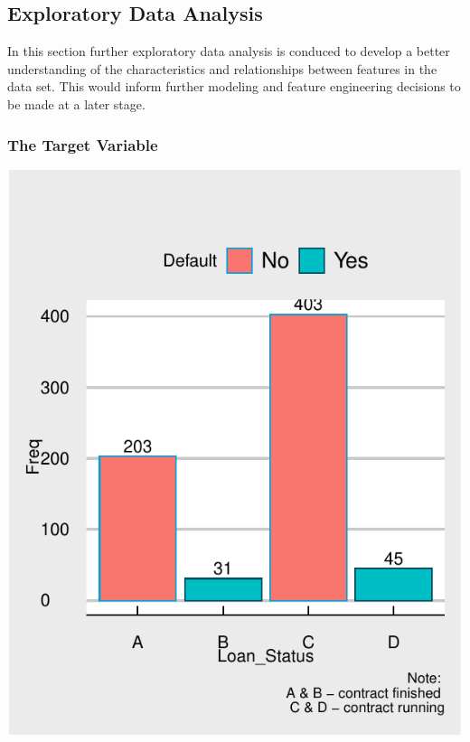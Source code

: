 \documentclass[11pt,preprint, authoryear]{elsarticle}
\let\origfigure\figure
\let\endorigfigure\endfigure
\renewenvironment{figure}[1][2] {
    \expandafter\origfigure\expandafter[H]
} {
    \endorigfigure
}
\numberwithin{equation}{section}
\numberwithin{figure}{section}
\numberwithin{table}{section}
\begin{document}
\hypertarget{exploratory-data-analysis}{%
\subsection{Exploratory Data Analysis}\label{exploratory-data-analysis}}

In this section further exploratory data analysis is conduced to develop
a better understanding of the characteristics and relationships between
features in the data set. This would inform further modeling and feature
engineering decisions to be made at a later stage.

\hypertarget{the-target-variable}{%
\subsubsection{The Target Variable}\label{the-target-variable}}

\begin{figure}[H]

{\centering \includegraphics{DS-Report-20065124_files/figure-latex/FigureLoanStatus-1} 

}

\caption{Understanding Loan Statuses and Defaults \label{FigureLoanStatus}}\label{fig:FigureLoanStatus}
\end{figure}
\end{document}
